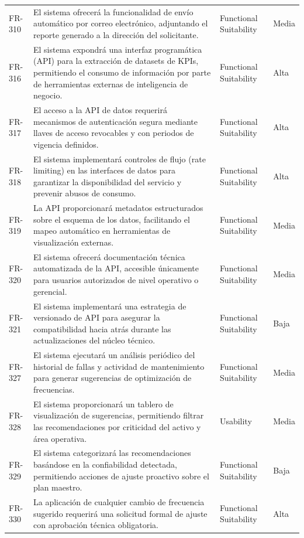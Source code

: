 \begin{longtable}{>{\raggedright\arraybackslash}p{} >{\raggedright\arraybackslash}p{} >{\raggedright\arraybackslash}p{} >{\raggedright\arraybackslash}p{}}
FR-310 & El sistema ofrecerá la funcionalidad de envío automático por correo electrónico, adjuntando el reporte generado a la dirección del solicitante. & Functional Suitability & Media \\
FR-316 & El sistema expondrá una interfaz programática (API) para la extracción de datasets de KPIs, permitiendo el consumo de información por parte de herramientas externas de inteligencia de negocio. & Functional Suitability & Alta \\
FR-317 & El acceso a la API de datos requerirá mecanismos de autenticación segura mediante llaves de acceso revocables y con periodos de vigencia definidos. & Functional Suitability & Alta \\
FR-318 & El sistema implementará controles de flujo (rate limiting) en las interfaces de datos para garantizar la disponibilidad del servicio y prevenir abusos de consumo. & Functional Suitability & Alta \\
FR-319 & La API proporcionará metadatos estructurados sobre el esquema de los datos, facilitando el mapeo automático en herramientas de visualización externas. & Functional Suitability & Media \\
FR-320 & El sistema ofrecerá documentación técnica automatizada de la API, accesible únicamente para usuarios autorizados de nivel operativo o gerencial. & Functional Suitability & Media \\
FR-321 & El sistema implementará una estrategia de versionado de API para asegurar la compatibilidad hacia atrás durante las actualizaciones del núcleo técnico. & Functional Suitability & Baja \\
FR-327 & El sistema ejecutará un análisis periódico del historial de fallas y actividad de mantenimiento para generar sugerencias de optimización de frecuencias. & Functional Suitability & Media \\
FR-328 & El sistema proporcionará un tablero de visualización de sugerencias, permitiendo filtrar las recomendaciones por criticidad del activo y área operativa. & Usability & Media \\
FR-329 & El sistema categorizará las recomendaciones basándose en la confiabilidad detectada, permitiendo acciones de ajuste proactivo sobre el plan maestro. & Functional Suitability & Baja \\
FR-330 & La aplicación de cualquier cambio de frecuencia sugerido requerirá una solicitud formal de ajuste con aprobación técnica obligatoria. & Functional Suitability & Alta \\

\end{longtable}
